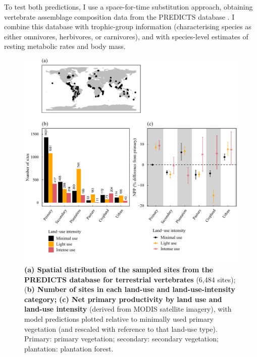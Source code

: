 To test both predictions, I use a space-for-time substitution approach, obtaining vertebrate assemblage composition data from the PREDICTS database \citep{Hudson2014, Hudson2017}. I combine this database with trophic-group information (characterising species as either omnivores, herbivores, or carnivores), and with species-level estimates of resting metabolic rates and body mass. 
  
\begin{figure}[h!]
\centering
\includegraphics[scale=0.75]{figures/Chapter5/Figure1}
\caption[Map of PREDICTS sites, sample sizes and NPP by land use and land-use intensity]{\textbf{(a) Spatial distribution of the sampled sites from the PREDICTS database for terrestrial vertebrates} (6,484 sites); (\textbf{b) Number of sites in each land-use and land-use-intensity category;} \textbf{(c) Net primary productivity by land use and land-use intensity} (derived from MODIS satellite imagery), with model predictions plotted relative to minimally used primary vegetation (and rescaled with reference to that land-use type). Primary: primary vegetation; secondary: secondary vegetation; plantation: plantation forest.}
\label{chap5_fig1}
\end{figure}

\clearpage

